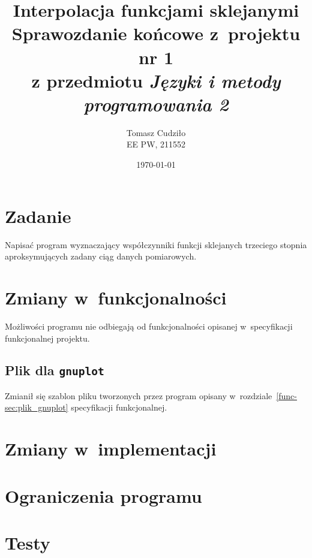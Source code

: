 \documentclass[10pt,a4paper]{article}
\begin{document}
\title{ 
  Interpolacja funkcjami sklejanymi\\
  {\normalsize Sprawozdanie końcowe z~projektu nr 1}\\\vspace{-12pt}
  {\normalsize z przedmiotu \emph{Języki i metody programowania 2}}
}
\author{
  Tomasz Cudziło\\
  {\small EE PW, 211552}
}
\date{\today}
\maketitle

\section*{Zadanie}
\label{sec:zadanie}

Napisać program wyznaczający współczynniki funkcji sklejanych trzeciego stopnia
aproksymujących zadany ciąg danych pomiarowych.

\vspace{24pt}

\section{Zmiany w~funkcjonalności}
Możliwości programu nie odbiegają od funkcjonalności opisanej w~specyfikacji
funkcjonalnej projektu.

\subsection{Plik dla \texttt{gnuplot}}
Zmianił się szablon pliku tworzonych przez program opisany
w~rozdziale~\ref{func-sec:plik_gnuplot} specyfikacji funkcjonalnej.

\section{Zmiany w~implementacji}

\section{Ograniczenia programu}

\section{Testy}
\end{document}

